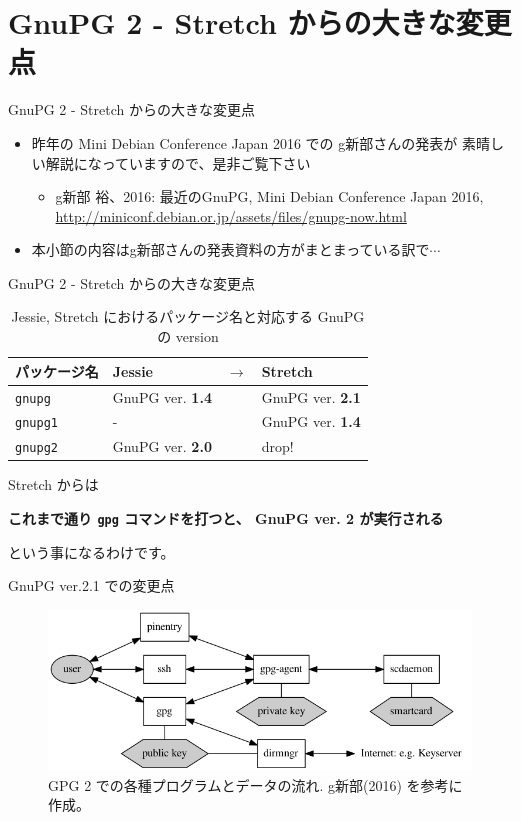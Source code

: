 \documentclass[cjk,c,squeeze,shrink,dvipdfmx,11pt,%
hyperref={bookmarks=true,bookmarksnumbered=true,bookmarksopen=false,%
colorlinks=false,%
pdftitle={},%
pdfauthor={}%
pdfinstitute={関西 Debian 勉強会},%
pdfsubject={},%
}]{beamer}
\begin{document}
\section{GnuPG 2 - Stretch からの大きな変更点}
\begin{frame}{GnuPG 2 - Stretch からの大きな変更点}
  \begin{itemize}
  \item %
    昨年の Mini Debian Conference Japan 2016 での g新部さんの発表が
    素晴しい解説になっていますので、是非ご覧下さい
    \begin{itemize}
    \item %
      g新部 裕、2016: 最近のGnuPG, Mini Debian Conference Japan 2016,\\
      \url{http://miniconf.debian.or.jp/assets/files/gnupg-now.html}
    \end{itemize}
  \item %
    本小節の内容はg新部さんの発表資料の方がまとまっている訳で$\cdots$
  \end{itemize}
\end{frame}
\begin{frame}{GnuPG 2 - Stretch からの大きな変更点}
  \begin{table}
    \caption{Jessie, Stretch におけるパッケージ名と対応する GnuPG の version}
    \label{table:Jessie, Stretch におけるパッケージ名と対応する GnuPG の version}
    \centering
    \begin{tabular}[htbp!]{llcl}
      \hline
      パッケージ名     & Jessie                  & $\to$ & Stretch                 \\
      \hline
      \texttt{gnupg}   & GnuPG ver. \textbf{1.4} &       & GnuPG ver. \textbf{2.1} \\
      \texttt{gnupg1}  & -                       &       & GnuPG ver. \textbf{1.4} \\
      \texttt{gnupg2}  & GnuPG ver. \textbf{2.0} &       & drop!                   \\
      \hline
    \end{tabular}
  \end{table}
  Stretch からは
  \begin{center}
    \textbf{%
      これまで通り \texttt{gpg} コマンドを打つと、%
      GnuPG ver. 2 が実行される
    }
  \end{center}
  という事になるわけです。
\end{frame}
\begin{frame}{GnuPG ver.2.1 での変更点}
  \begin{figure}[htbp!]
    \centering
    \includegraphics[width=.8\linewidth]{image201705/gnupg2.png}
    \caption{%
      GPG 2 での各種プログラムとデータの流れ.
      g新部(2016) を参考に作成。
    }
    \label{figure:GnuPG 2 での各種プログラムとデータの流れ}
  \end{figure}
\end{frame}
\end{document}

